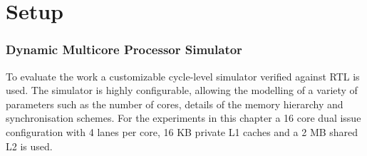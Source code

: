 \chapter{Setup}\label{chp:setup}

\subsection{Dynamic Multicore Processor Simulator}

To evaluate the work a customizable cycle-level simulator verified against RTL is used.
The simulator is highly configurable, allowing the modelling of a variety of parameters such as the number of cores, details of the memory hierarchy and synchronisation schemes.
For the experiments in this chapter a 16 core dual issue configuration with 4 lanes per core, 16 KB private L1 caches and a 2 MB shared L2 is used.
